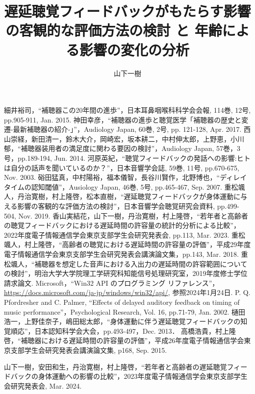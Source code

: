 \documentclass[a4paper,12pt]{jsreport}
\title{遅延聴覚フィードバックがもたらす影響の客観的な評価方法の検討
と
年齢による影響の変化の分析}
\author{山下\hspace{1zw}一樹}%
\begin{document}
\makecover%
\tableofcontents%










\begin{thebibliography}{99}
	細井裕司，``補聴器この20年間の進歩''，日本耳鼻咽喉科科学会会報, 114巻, 12号, pp.905-911, Jan. 2015.
  神田幸彦，``補聴器の進歩と聴覚医学「補聴器の歴史と変遷-最新補聴器の紹介-」''，Audiology Japan, 60巻, 2号, pp. 121-128, Apr. 2017.
  西山崇経，新田清一，鈴木大介，岡崎宏，坂本耕二，中村伸太郎，上野恵，小川郁，``補聴器装用者の満足度に関わる要因の検討''，Audiology Japan, 57巻，3号，pp.189-194, Jun. 2014.
  河原英紀，``聴覚フィードバックの発話への影響:ヒトは自分の話声を聞いているのか？''，日本音響学会誌, 59巻, 11号, pp.670-675, Nov. 2003.
  硲田猛真，中村陽裕，福本儀智，長谷川賢作，北野博也，``ディレイタイムの認知閾値''，Ausiology Japan, 46巻, 5号, pp.465-467, Sep. 2007.
  重松颯人，丹治寛樹，村上隆啓，松本直樹，``遅延聴覚フィードバックが身体運動に与える影響の客観的な評価方法の検討''，日本音響学会聴覚研究会資料, pp.499-504, Nov. 2019.
  香山実結花，山下一樹，丹治寛樹，村上隆啓，``若年者と高齢者の聴覚フィードバックにおける遅延時間の許容量の統計的分析による比較''，2022年度電子情報通信学会東京支部学生会研究発表会, pp.113, Mar. 2023.
  重松颯人，村上隆啓，``高齢者の聴覚における遅延時間の許容量の評価''，平成29年度電子情報通信学会東京支部学生会研究発表会講演論文集，pp.143, Mar. 2018.
  重松颯人，``補聴器を想定した音声における入出力の遅延時間の許容範囲についての検討''，明治大学大学院理工学研究科知能信号処理研究室，2019年度修士学位請求論文.
  Microsoft，``Win32 API のプログラミング リファレンス''，\url{https://docs.microsoft.com/ja-jp/windows/win32/api/}, 参照2024年1月24日.
  P. Q. Pfordresher and C. Palmer, ``Effects of delayed auditory feedback on timing of music performance''，Psychological Research, Vol. 16, pp.71-79, Jan. 2002.
  樋田浩一，上野佳奈子，嶋田総太郎，``身体運動に伴う遅延聴覚フィードバックの知覚順応''，日本認知科学会大会，pp.493-497，Dec. 2013．
  高橋浩貴，村上隆啓，``補聴器における遅延時間の許容量の評価''，平成26年度電子情報通信学会東京支部学生会研究発表会講演論文集, p168, Sep. 2015.

\end{thebibliography}
\begin{thepublished}{99}
	山下一樹，安田和生，丹治寛樹，村上隆啓，``若年者と高齢者の遅延聴覚フィードバックの身体運動への影響の比較''，2023年度電子情報通信学会東京支部学生会研究発表会, Mar. 2024.
	
\end{thepublished}
\newpage



\appendix
% 
% 
% 
% 
\end{document}
